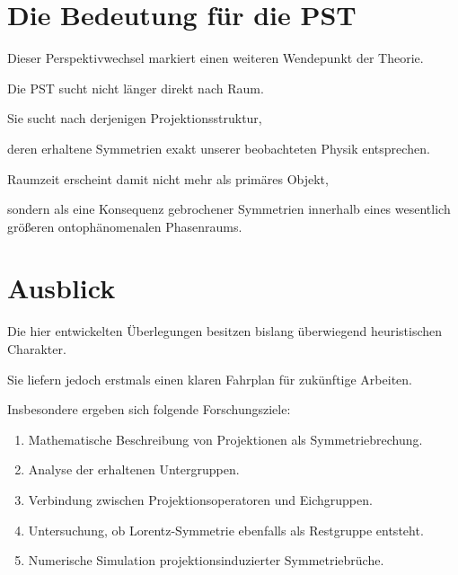 \begin{itemize}
\begin{itemize}
\begin{itemize}

\section*{Die Bedeutung für die PST}

Dieser Perspektivwechsel markiert einen weiteren Wendepunkt der Theorie.

Die PST sucht nicht länger direkt nach Raum.

Sie sucht nach derjenigen Projektionsstruktur,

deren erhaltene Symmetrien exakt unserer beobachteten Physik entsprechen.

Raumzeit erscheint damit nicht mehr als primäres Objekt,

sondern als eine Konsequenz gebrochener Symmetrien innerhalb eines wesentlich größeren ontophänomenalen Phasenraums.


\section*{Ausblick}

Die hier entwickelten Überlegungen besitzen bislang überwiegend heuristischen Charakter.

Sie liefern jedoch erstmals einen klaren Fahrplan für zukünftige Arbeiten.

Insbesondere ergeben sich folgende Forschungsziele:

\begin{enumerate}

\item

Mathematische Beschreibung von Projektionen als Symmetriebrechung.

\item

Analyse der erhaltenen Untergruppen.

\item

Verbindung zwischen Projektionsoperatoren und Eichgruppen.

\item

Untersuchung, ob Lorentz-Symmetrie ebenfalls als Restgruppe entsteht.

\item

Numerische Simulation projektionsinduzierter Symmetriebrüche.


\end{enumerate}
\end{itemize}
\end{itemize}
\end{itemize}
